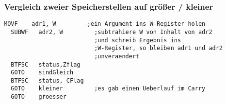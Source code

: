 \subsubsection*{Vergleich zweier Speicherstellen auf größer / kleiner}
\begin{lstlisting}[language={[mips]Assembler}]
  MOVF    adr1, W         ;ein Argument ins W-Register holen
  SUBWF   adr2, W         ;subtrahiere W von Inhalt von adr2
                          ;und schreib Ergebnis ins 
                          ;W-Register, so bleiben adr1 und adr2
                          ;unveraendert
  BTFSC   status,Zflag
  GOTO    sindGleich
  BTFSC   status, CFlag
  GOTO    kleiner         ;es gab einen Ueberlauf im Carry
  GOTO    groesser        
  \end{lstlisting}